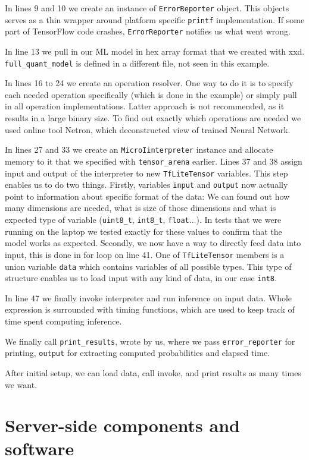 In lines 9 and 10 we create an instance of \verb|ErrorReporter| object.
This objects serves as a thin wrapper around platform specific \verb|printf| implementation.
If some part of TensorFlow code crashes, \verb|ErrorReporter| notifies us what went wrong.

In line 13 we pull in our ML model in hex array format that we created with xxd.
\verb|full_quant_model| is defined in a different file, not seen in this example.

In lines 16 to 24 we create an operation resolver.
One way to do it is to specify each needed operation specifically (which is done in the example) or simply pull in all operation implementations.
Latter approach is not recommended, as it results in a large binary size.
To find out exactly which operations are needed we used online tool Netron\cite{netron}, which deconstructed view of trained Neural Network.

In lines 27 and 33 we create an \verb|MicroIinterpreter| instance and allocate memory to it that we specified with \verb|tensor_arena| earlier.
Lines 37 and 38 assign input and output of the interpreter to new \verb|TfLiteTensor| variables.
This step enables us to do two things.
Firstly, variables \verb|input| and \verb|output| now actually point to information about specific format of the data: We can found out how many dimensions are needed, what is size of those dimensions and what is expected type of variable (\verb|uint8_t|, \verb|int8_t|, \verb|float|...).
In tests that we were running on the laptop we tested exactly for these values to confirm that the model works as expected.
Secondly, we now have a way to directly feed data into input, this is done in for loop on line 41.
One of \verb|TfLiteTensor| members is a union variable \verb|data| which contains variables of all possible types.
This type of structure enables us to load input with any kind of data, in our case \verb|int8|.

In line 47 we finally invoke interpreter and run inference on input data.
Whole expression is surrounded with timing functions, which are used to keep track of time spent computing inference.

We finally call \verb|print_results|, wrote by us, where we pass \verb|error_reporter| for printing, \verb|output| for extracting computed probabilities and elapsed time.

After initial setup, we can load data, call invoke, and print results as many times we want.


\section{ Server-side components and software}

